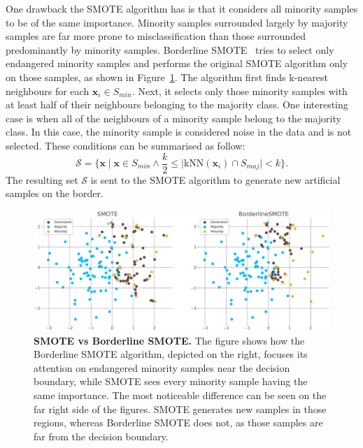 One drawback the SMOTE algorithm has is that it considers all minority samples to be of the same
importance. Minority samples surrounded largely by majority samples are far more prone to
misclassification than those surrounded predominantly by minority samples. Borderline
SMOTE~\cite{borderline-smote} tries to select only endangered minority samples and performs the
original SMOTE algorithm only on those samples, as shown in
Figure~\ref{figure:smote-vs-borderline}. The algorithm first finds k-nearest neighbours for each
$\mathbf{x}_i \in S_{min}$. Next, it selects only those minority samples with at least half of
their neighbours belonging to the majority class. One interesting case is when all of the
neighbours of a minority sample belong to the majority class. In this case, the minority sample is
considered noise in the data and is not selected. These conditions can be summarised as follow:
\begin{equation}
    \mathcal{S} = \{\mathbf{x} \mid \mathbf{x} \in S_{min} \land \frac{k}{2} \leq \lvert
        \mathrm{kNN}(\mathbf{x}_i) \cap S_{maj} \rvert < k\}.
\end{equation}
The resulting set $\mathcal{S}$ is sent to the SMOTE algorithm to generate new artificial samples
on the border.

\begin{figure}
    \centering
    \includegraphics[width=\linewidth]{figures/smote_vs_borderlinesmote.eps}
    \caption{
        \textbf{SMOTE vs Borderline SMOTE.} The figure shows how the Borderline SMOTE algorithm,
        depicted on the right, focuses its attention on endangered minority samples near the
        decision boundary, while SMOTE sees every minority sample having the same importance. The
        most noticeable difference can be seen on the far right side of the figures. SMOTE
        generates new samples in those regions, whereas Borderline SMOTE does not, as those samples
        are far from the decision boundary.
    }
    \label{figure:smote-vs-borderline}
\end{figure}


